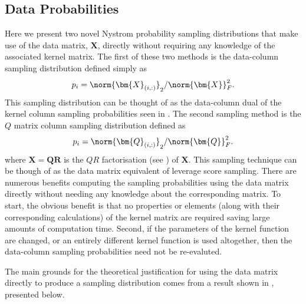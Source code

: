 \subsection{Data Probabilities}\label{Section2.3}

Here we present two novel Nystrom probability sampling distributions that make use of the data matrix, $\bm{X}$, directly without requiring any knowledge of the associated kernel matrix. The first of these two methods is the data-column sampling distribution defined simply as
\begin{equation*}
    p_{i} = \norm{\bm{X}_{(i,:)}}_2 / \norm{\bm{X}}_{F}^2.
\end{equation*}
This sampling distribution can be thought of as the data-column dual of the kernel column sampling probabilities seen in . The second sampling method is the $Q$ matrix column sampling distribution defined as
\begin{equation*}
    p_{i} = \norm{\bm{Q}_{(i,:)}}_2 / \norm{\bm{Q}}_{F}^2.
\end{equation*}
where $\bm{X} = \bm{Q} \bm{R}$ is the $QR$ factorisation (see ) of $\bm{X}$. This sampling technique can be though of as the data matrix equivalent of leverage score sampling. There are numerous benefits computing the sampling probabilities using the data matrix directly without needing any knowledge about the corresponding matrix. To start, the obvious benefit is that no properties or elements (along with their corresponding calculations) of the kernel matrix are required saving large amounts of computation time. Second, if the parameters of the kernel function are changed, or an entirely different kernel function is used altogether, then the data-column sampling probabilities need not be re-evaluted.

The main grounds for the theoretical justification for using the data matrix directly to produce a sampling distribution comes from a result shown in \cite{KarouiNoureddineEl2010TSOK}, presented below.

\renewcommand{\labelenumi}{(\alph{enumi})}

